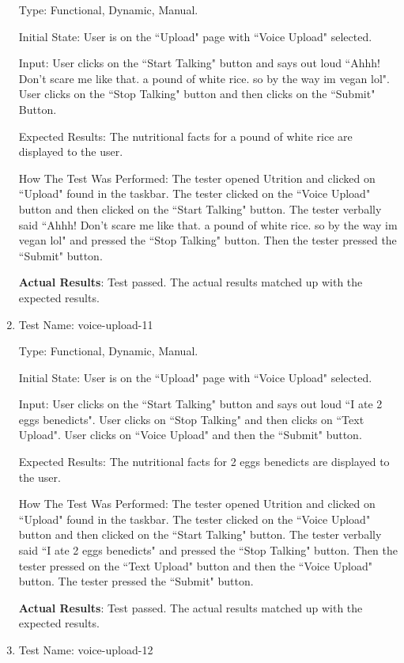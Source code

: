 \documentclass[12pt, titlepage]{article}
\begin{document}
\begin{enumerate}
		Type: Functional, Dynamic, Manual.
		
		Initial State: User is on the ``Upload" page with ``Voice Upload" selected.
		
		Input: User clicks on the ``Start Talking" button and says out loud ``Ahhh! Don't scare me like that. a pound of white rice. so by the way im vegan lol". User clicks on the ``Stop Talking" button and then clicks on the ``Submit" Button.
		
		Expected Results: The nutritional facts for a pound of white rice are displayed to the user.
		
		How The Test Was Performed: The tester opened Utrition and clicked on ``Upload" found in the taskbar. The tester clicked on the ``Voice Upload" button and then clicked on the ``Start Talking" button. The tester verbally said ``Ahhh! Don't scare me like that. a pound of white rice. so by the way im vegan lol" and pressed the ``Stop Talking" button. Then the tester pressed the ``Submit" button.
		
		\textbf{Actual Results}: Test passed. The actual results matched up with the expected results.
	
		\item{Test Name: voice-upload-11}
		
		Type: Functional, Dynamic, Manual.
		
		Initial State: User is on the ``Upload" page with ``Voice Upload" selected.
		
		Input: User clicks on the ``Start Talking" button and says out loud ``I ate 2 eggs benedicts". User clicks on ``Stop Talking" and then clicks on ``Text Upload". User clicks on ``Voice Upload" and then the ``Submit" button.
		
		Expected Results: The nutritional facts for 2 eggs benedicts are displayed to the user.
		
		How The Test Was Performed: The tester opened Utrition and clicked on ``Upload" found in the taskbar. The tester clicked on the ``Voice Upload" button and then clicked on the ``Start Talking" button. The tester verbally said ``I ate 2 eggs benedicts" and pressed the ``Stop Talking" button. Then the tester pressed on the ``Text Upload" button and then the ``Voice Upload" button. The tester pressed the ``Submit" button.
		
		\textbf{Actual Results}: Test passed. The actual results matched up with the expected results.
		
		\item{Test Name: voice-upload-12}
		

\end{enumerate}
\end{document}
